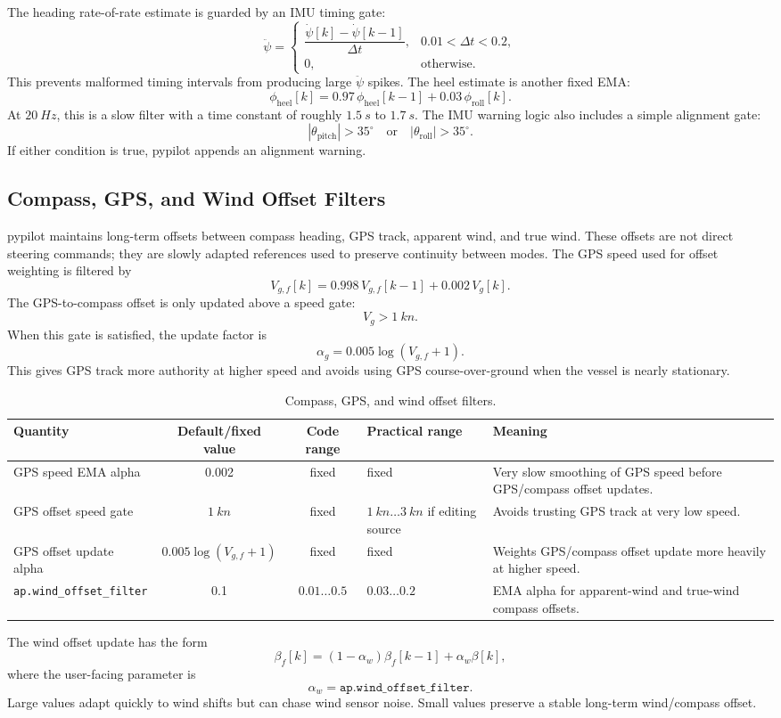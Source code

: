 \documentclass[10pt,twocolumn]{article}
\newcommand{\abs}[1]{\left\lvert #1 \right\rvert}
\begin{document}
The heading rate-of-rate estimate is guarded by an IMU timing gate:
\[
\ddot{\psi}
=
\begin{cases}
\dfrac{\dot{\psi}[k]-\dot{\psi}[k-1]}{\Delta t},
& \num{0.01} < \Delta t < \num{0.2},\\[8pt]
0, & \text{otherwise}.
\end{cases}
\]
This prevents malformed timing intervals from producing large
\(\ddot{\psi}\) spikes.
The heel estimate is another fixed EMA:
\[
\phi_{\mathrm{heel}}[k]
=
0.97\,\phi_{\mathrm{heel}}[k-1]
+
0.03\,\phi_{\mathrm{roll}}[k].
\]
At \(\SI{20}{Hz}\), this is a slow filter with a time constant of roughly
\(\SI{1.5}{s}\) to \(\SI{1.7}{s}\).
The IMU warning logic also includes a simple alignment gate:
\[
\abs{\theta_{\mathrm{pitch}}} > 35^\circ
\quad\text{or}\quad
\abs{\theta_{\mathrm{roll}}} > 35^\circ .
\]
If either condition is true, pypilot appends an alignment warning.
\subsection{Compass, GPS, and Wind Offset Filters}
pypilot maintains long-term offsets between compass heading, GPS track,
apparent wind, and true wind.  These offsets are not direct steering
commands; they are slowly adapted references used to preserve continuity
between modes.
The GPS speed used for offset weighting is filtered by
\[
V_{g,f}[k]
=
0.998\,V_{g,f}[k-1]
+
0.002\,V_g[k].
\]
The GPS-to-compass offset is only updated above a speed gate:
\[
V_g > \SI{1}{kn}.
\]
When this gate is satisfied, the update factor is
\[
\alpha_g
=
0.005\log(V_{g,f}+1).
\]
This gives GPS track more authority at higher speed and avoids using GPS
course-over-ground when the vessel is nearly stationary.
\begin{table}[!tbp]
\centering
\caption{Compass, GPS, and wind offset filters.}
\label{tab:pypilot-offset-filters}
\begin{tabularx}{\textwidth}{Z{0.23\textwidth}c c Z{0.16\textwidth}Y}
\toprule
Quantity & Default/fixed value & Code range & Practical range & Meaning \\
\midrule
GPS speed EMA alpha &
\num{0.002} &
fixed &
fixed &
Very slow smoothing of GPS speed before GPS/compass offset updates. \\
GPS offset speed gate &
\(\SI{1}{kn}\) &
fixed &
\(\SI{1}{kn}\ldots\SI{3}{kn}\) if editing source &
Avoids trusting GPS track at very low speed. \\
GPS offset update alpha &
\(0.005\log(V_{g,f}+1)\) &
fixed &
fixed &
Weights GPS/compass offset update more heavily at higher speed. \\
\texttt{ap.wind\_offset\_filter} &
\num{0.1} &
\(\num{0.01}\ldots\num{0.5}\) &
\(\num{0.03}\ldots\num{0.2}\) &
EMA alpha for apparent-wind and true-wind compass offsets. \\
\bottomrule
\end{tabularx}
\end{table}
The wind offset update has the form
\[
\beta_f[k]
=
(1-\alpha_w)\beta_f[k-1]
+
\alpha_w \beta[k],
\]
where the user-facing parameter is
\[
\alpha_w = \texttt{ap.wind\_offset\_filter}.
\]
Large values adapt quickly to wind shifts but can chase wind sensor noise.
Small values preserve a stable long-term wind/compass offset.
\end{document}
